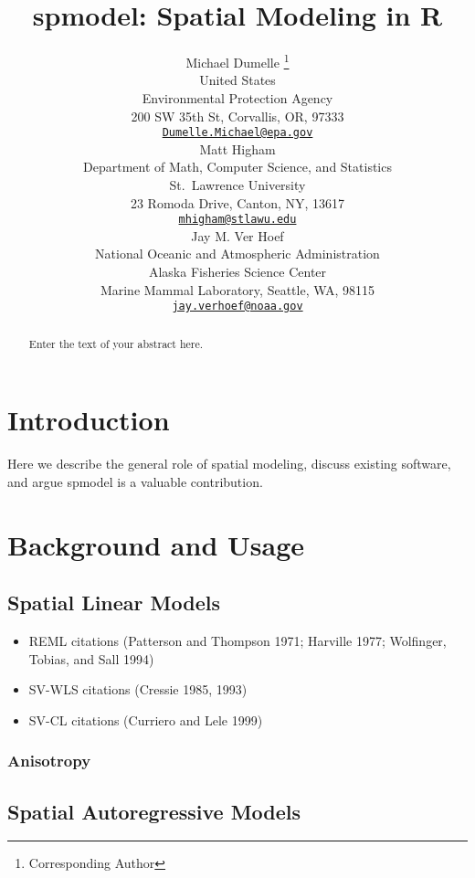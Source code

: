 \documentclass{article}
\title{spmodel: Spatial Modeling in \textbf{R}}
\author{
    Michael Dumelle
    \thanks{Corresponding Author}
   \\
    United States \\
    Environmental Protection Agency \\
  200 SW 35th St, Corvallis, OR, 97333 \\
  \texttt{\href{mailto:Dumelle.Michael@epa.gov}{\nolinkurl{Dumelle.Michael@epa.gov}}} \\
   \And
    Matt Higham
   \\
    Department of Math, Computer Science, and Statistics \\
    St.~Lawrence University \\
  23 Romoda Drive, Canton, NY, 13617 \\
  \texttt{\href{mailto:mhigham@stlawu.edu}{\nolinkurl{mhigham@stlawu.edu}}} \\
   \And
    Jay M. Ver Hoef
   \\
    National Oceanic and Atmospheric Administration \\
    Alaska Fisheries Science Center \\
  Marine Mammal Laboratory, Seattle, WA, 98115 \\
  \texttt{\href{mailto:jay.verhoef@noaa.gov}{\nolinkurl{jay.verhoef@noaa.gov}}} \\
  }
\providecommand{\tightlist}{%
  \setlength{\itemsep}{0pt}\setlength{\parskip}{0pt}}
\begin{document}
\maketitle


\begin{abstract}
Enter the text of your abstract here.
\end{abstract}


\hypertarget{introduction}{%
\section{\texorpdfstring{Introduction
\label{sec:introduction}}{Introduction }}\label{introduction}}

Here we describe the general role of spatial modeling, discuss existing
software, and argue spmodel is a valuable contribution.

\hypertarget{background-and-usage}{%
\section{Background and Usage}\label{background-and-usage}}

\hypertarget{spatial-linear-models}{%
\subsection{Spatial Linear Models}\label{spatial-linear-models}}

\begin{itemize}
\tightlist
\item
  REML citations (Patterson and Thompson 1971; Harville 1977; Wolfinger,
  Tobias, and Sall 1994)
\item
  SV-WLS citations (Cressie 1985, 1993)
\item
  SV-CL citations (Curriero and Lele 1999)
\end{itemize}

\hypertarget{anisotropy}{%
\subsubsection{Anisotropy}\label{anisotropy}}

\hypertarget{spatial-autoregressive-models}{%
\subsection{Spatial Autoregressive
Models}\label{spatial-autoregressive-models}}
\end{document}
